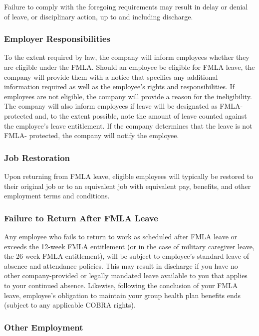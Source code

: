 Failure to comply with the foregoing requirements may result in delay or denial of leave, or disciplinary action, up to and including discharge.

\subsubsection{Employer Responsibilities}

To the extent required by law, the company will inform employees whether they are eligible under the FMLA. Should an employee be eligible for FMLA leave, the company will provide them with a notice that specifies any additional information required as well as the employee's rights and responsibilities. If employees are not eligible, the company will provide a reason for the ineligibility. The company will also inform employees if leave will be designated as FMLA-protected and, to the extent possible, note the amount of leave counted against the employee's leave entitlement. If the company determines that the leave is not FMLA- protected, the company will notify the employee.

\subsubsection{Job Restoration}

Upon returning from FMLA leave, eligible employees will typically be restored to their original job or to an equivalent job with equivalent pay, benefits, and other employment terms and conditions.

\subsubsection{Failure to Return After FMLA Leave}

Any employee who fails to return to work as scheduled after FMLA leave or exceeds the 12-week FMLA entitlement (or in the case of military caregiver leave, the 26-week FMLA entitlement), will be subject to employee's standard leave of absence and attendance policies. This may result in discharge if you have no other company-provided or legally mandated leave available to you that applies to your continued absence. Likewise, following the conclusion of your FMLA leave, employee's obligation to maintain your group health plan benefits ends (subject to any applicable COBRA rights).

\subsubsection{Other Employment}

